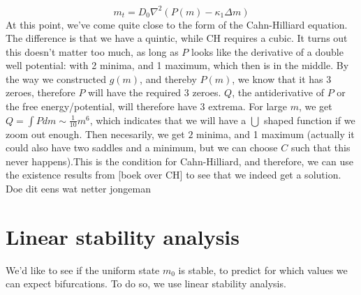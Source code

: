 \documentclass[a4paper]{jpconf}
\begin{document}
\[
m_t = D_0\nabla^2(P(m)-\kappa_1\Delta m)
\]
At this point, we've come quite close to the form of the Cahn-Hilliard equation. The difference is that we have a quintic, while CH requires a cubic. It turns out this doesn't matter too much, as long as $P$ looks like the derivative of a double well potential: with 2 minima, and 1 maximum, which then is in the middle. By the way we constructed $g(m)$, and thereby $P(m)$, we know that it has $3$ zeroes, therefore $P$ will have the required 3 zeroes.
$Q$, the antiderivative of $P$ or the free energy/potential, will therefore have $3$ extrema. For large $m$, we get $Q=\int Pdm\sim \frac1{10}m^6$, which indicates that we will have a $\bigcup$ shaped function if we zoom out enough. Then necesarily, we get $2$ minima, and 1 maximum (actually it could also have two saddles and a minimum, but we can choose $C$ such that this never happens).This is the condition for Cahn-Hilliard, and therefore, we can use the existence results from [boek over CH] to see that we indeed get a solution. 
{\color{red} Doe dit eens wat netter jongeman}



\section{Linear stability analysis}
We'd like to see if the uniform state $m_0$ is stable, to predict for which values we can expect bifurcations. To do so, we use linear stability analysis. 
\end{document}
